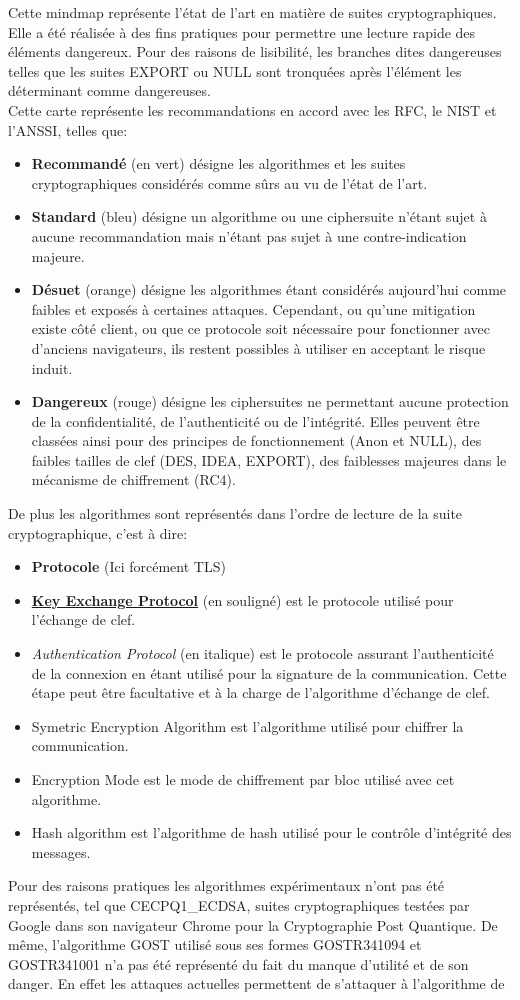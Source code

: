 \documentclass[twoside,a4paper,12pt,titlepage]{book}
\begin{document}
Cette mindmap représente l'état de l'art en matière de suites cryptographiques. Elle a été réalisée à des fins pratiques pour permettre une lecture rapide des éléments dangereux. Pour des raisons de lisibilité, les branches dites dangereuses telles que les suites EXPORT ou NULL sont tronquées après l'élément les déterminant comme dangereuses.\\Cette carte représente les recommandations en accord avec les RFC, le NIST et l'ANSSI, telles que:\begin{itemize}\item \textbf{Recommandé} (en vert) désigne les algorithmes et les suites cryptographiques considérés comme sûrs au vu de l'état de l'art.\item \textbf{Standard} (bleu) désigne un algorithme ou une ciphersuite n'étant sujet à aucune recommandation mais n'étant pas sujet à une contre-indication majeure.\item \textbf{Désuet} (orange) désigne les algorithmes étant considérés aujourd'hui comme faibles et exposés à certaines attaques. Cependant, ou qu'une mitigation existe côté client, ou que ce protocole soit nécessaire pour fonctionner avec d'anciens navigateurs, ils restent possibles à utiliser en acceptant le risque induit.\item\textbf{Dangereux} (rouge) désigne les ciphersuites ne permettant aucune protection de la confidentialité, de l'authenticité ou de l'intégrité. Elles peuvent être classées ainsi pour des principes de fonctionnement (Anon et NULL), des faibles tailles de clef (DES, IDEA, EXPORT), des faiblesses majeures dans le mécanisme de chiffrement (RC4).\end{itemize}De plus les algorithmes sont représentés dans l'ordre de lecture de la suite cryptographique, c'est à dire:\begin{itemize}\item \textbf{Protocole} (Ici forcément TLS) \item \underline{\textbf{Key Exchange Protocol}} (en souligné) est le protocole utilisé pour l'échange de clef. \item \textit{Authentication Protocol} (en italique) est le protocole assurant l'authenticité de la connexion en étant utilisé pour la signature de la communication. Cette étape peut être facultative et à la charge de l'algorithme d'échange de clef.\item Symetric Encryption Algorithm est l'algorithme utilisé pour chiffrer la communication. \item Encryption Mode est le mode de chiffrement par bloc utilisé avec cet algorithme.\item Hash algorithm est l'algorithme de hash utilisé pour le contrôle d'intégrité des messages. \end{itemize}Pour des raisons pratiques les algorithmes expérimentaux n'ont pas été représentés, tel que CECPQ1\_ECDSA, suites cryptographiques testées par Google dans son navigateur Chrome pour la Cryptographie Post Quantique. De même, l'algorithme GOST utilisé sous ses formes GOSTR341094 et GOSTR341001 n'a pas été représenté du fait du manque d'utilité et de son danger. En effet les attaques actuelles permettent de s'attaquer à l'algorithme de 
\end{document}
